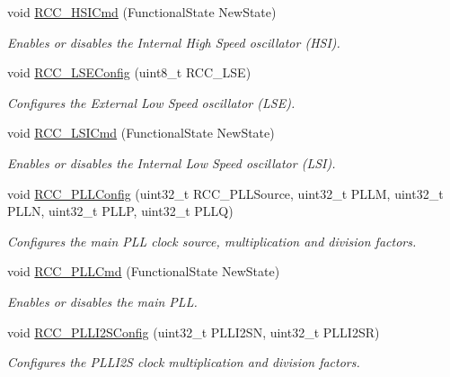 \begin{DoxyCompactItemize}
void \hyperlink{group___r_c_c___group1_ga0c6772a1e43765909495f57815ef69e2}{R\-C\-C\-\_\-\-H\-S\-I\-Cmd} (Functional\-State New\-State)
\begin{DoxyCompactList}\small\item\em Enables or disables the Internal High Speed oscillator (H\-S\-I). \end{DoxyCompactList}\item 
void \hyperlink{group___r_c_c___group1_ga65209ab5c3589b249c7d70f978735ca6}{R\-C\-C\-\_\-\-L\-S\-E\-Config} (uint8\-\_\-t R\-C\-C\-\_\-\-L\-S\-E)
\begin{DoxyCompactList}\small\item\em Configures the External Low Speed oscillator (L\-S\-E). \end{DoxyCompactList}\item 
void \hyperlink{group___r_c_c___group1_ga81e3ca29fd154ac2019bba6936d6d5ed}{R\-C\-C\-\_\-\-L\-S\-I\-Cmd} (Functional\-State New\-State)
\begin{DoxyCompactList}\small\item\em Enables or disables the Internal Low Speed oscillator (L\-S\-I). \end{DoxyCompactList}\item 
void \hyperlink{group___r_c_c___group1_ga154b93e90bfdede2a874244a1ff1002e}{R\-C\-C\-\_\-\-P\-L\-L\-Config} (uint32\-\_\-t R\-C\-C\-\_\-\-P\-L\-L\-Source, uint32\-\_\-t P\-L\-L\-M, uint32\-\_\-t P\-L\-L\-N, uint32\-\_\-t P\-L\-L\-P, uint32\-\_\-t P\-L\-L\-Q)
\begin{DoxyCompactList}\small\item\em Configures the main P\-L\-L clock source, multiplication and division factors. \end{DoxyCompactList}\item 
void \hyperlink{group___r_c_c___group1_ga84dee53c75e58fdb53571716593c2272}{R\-C\-C\-\_\-\-P\-L\-L\-Cmd} (Functional\-State New\-State)
\begin{DoxyCompactList}\small\item\em Enables or disables the main P\-L\-L. \end{DoxyCompactList}\item 
void \hyperlink{group___r_c_c___group1_ga4c15157382939a693c15620a4867e6ad}{R\-C\-C\-\_\-\-P\-L\-L\-I2\-S\-Config} (uint32\-\_\-t P\-L\-L\-I2\-S\-N, uint32\-\_\-t P\-L\-L\-I2\-S\-R)
\begin{DoxyCompactList}\small\item\em Configures the P\-L\-L\-I2\-S clock multiplication and division factors. \end{DoxyCompactList}\item 

\end{DoxyCompactItemize}
